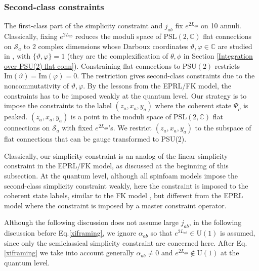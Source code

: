 \documentclass[aps,prd,notitlepage,nofootinbib,superscriptaddress,groupedaddress,twocolumn]{revtex4-1}
\def\C{\mathbb{C}}
\newcommand{\PSlc}{\mathrm{PSL}(2,\mathbb{C})}
\newcommand{\PSu}{\mathrm{PSU}(2)}
\def\be{\begin{eqnarray}}
\def\ee{\end{eqnarray}}
\newcommand{\cs}{\mathcal S}
\renewcommand{\a}{\alpha}
\newcommand{\im}{\mathrm{Im}}
\begin{document}


\subsubsection{Second-class constraints}

The first-class part of the simplicity constraint and $j_{ab}$ fix $e^{2L_{ab}}$ on 10 annuli. Classically, fixing $e^{2L_{ab}}$ reduces the moduli space of $\PSlc$ flat connections on $\cs_a$ to 2 complex dimensions whose Darboux coordinates $\vartheta,\varphi\in \C$ are studied in \cite{Nekrasov:2011bc}, with $\{\vartheta,\varphi\}=1$ (they are the complexification of $\theta,\phi$ in Section \ref{Integration over PSU(2) flat conn}). Constraining flat connections to $\PSu$ restricts $\im(\vartheta)=\im(\varphi)=0$. The restriction gives second-class constraints due to the noncommutativity of $\vartheta,\varphi$. By the lessons from the EPRL/FK model, the constraints has to be imposed weakly at the quantum level. Our strategy is to impose the constraints to the label $(z_a,x_a,y_a)$ where the coherent state $\Psi_\rho$ is peaked. $(z_a,x_a,y_a)$ is a point in the moduli space of $\PSlc$ flat connections on $\cs_a$ with fixed $e^{2L_{ab}}$'s. We restrict $(z_a,x_a,y_a)$ to the subspace of flat connections that can be gauge transformed to PSU(2). %

Classically, our simplicity constraint is an analog of the linear simplicity constraint in the EPRL/FK model, as discussed at the beginning of this subsection. At the quantum level, although all spinfoam models impose the second-class simplicity constraint weakly, here the constraint is imposed to the coherent state labels, similar to the FK model \cite{FK}, but different from the EPRL model where the constraint is imposed by a master constraint operator.

Although the following discussion does not assume large $j_{ab}$, in the following discussion before Eq.\eqref{xiframing}, we ignore $\a_{ab}$ so that $e^{2L_{ab}}\in \mathrm{U(1)}$ is assumed, since only the semiclassical simplicity constraint are concerned here. After Eq.\eqref{xiframing} we take into account generally $\a_{ab}\neq 0$ and $e^{2L_{ab}}\not\in \mathrm{U(1)}$ at the quantum level. 
\end{document}
